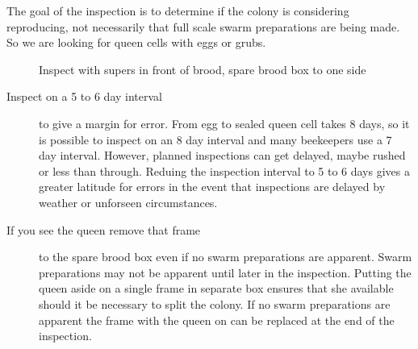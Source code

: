 The goal of the inspection is to determine if the colony is considering reproducing,
not necessarily that full scale swarm preparations are being made.
So we are looking for queen cells with eggs or grubs.

\begin{figure}[H]
\centering
{}
\caption{Inspect with supers in front of brood, spare brood box to one side}%
\end{figure}

\begin{description}
	\item [Inspect on a 5 to 6 day interval] to give a margin for error.
		From egg to sealed queen cell takes 8 days, so it is possible to inspect on an 8 day interval and many beekeepers use a 7 day interval.
		However, planned inspections can get delayed, maybe rushed or less than through.
		Reduing the inspection interval to 5 to 6 days gives a greater latitude for errors
		in the event that inspections are delayed by weather or unforseen circumstances.
	\item [If you see the queen remove that frame] to the spare brood box even if no swarm preparations are apparent.
		Swarm preparations may not be apparent until later in the inspection.
		Putting the queen aside on a single frame in separate box ensures that she available should it be necessary to split the colony.
		If no swarm preparations are apparent the frame with the queen on can be replaced at the end of the inspection.
\end{description}

